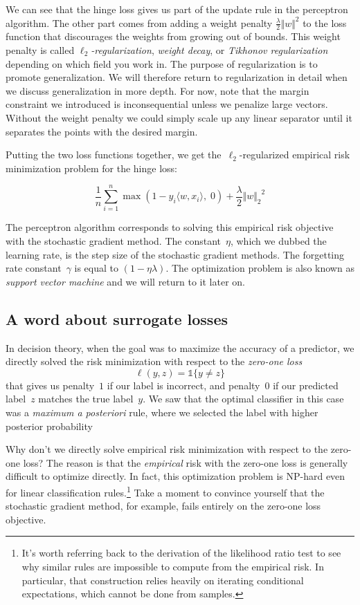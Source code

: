 \documentclass{tufte-book}
\begin{document}
We can see that the hinge loss gives us part of the update rule in the
perceptron algorithm. The other part comes from adding a weight penalty
\(\frac\lambda 2\Vert w\Vert^2\) to the loss function that discourages
the weights from growing out of bounds. This weight penalty is called
\emph{\(\ell_2\)-regularization}, \emph{weight decay}, or \emph{Tikhonov
regularization} depending on which field you work in. The purpose of
regularization is to promote generalization. We will therefore return to
regularization in detail when we discuss generalization in more depth.
For now, note that the margin constraint we introduced is
inconsequential unless we penalize large vectors. Without the weight
penalty we could simply scale up any linear separator until it separates
the points with the desired margin.

Putting the two loss functions together, we get
the~\(\ell_2\)-regularized empirical risk minimization problem for the
hinge loss:

\[
\frac{1}{n}\sum_{i=1}^n \max(1-y_i\langle w, x_i\rangle,\; 0) + \frac\lambda 2 {\Vert w \Vert_2}^2
\]

The perceptron algorithm corresponds to solving this empirical risk
objective with the stochastic gradient method. The constant~\(\eta\),
which we dubbed the learning rate, is the step size of the stochastic
gradient methods. The forgetting rate constant~\(\gamma\) is equal to
\((1-\eta \lambda)\). The optimization problem is also known as
\emph{support vector machine} and we will return to it later on.

\hypertarget{a-word-about-surrogate-losses}{%
\subsection{A word about surrogate
losses}\label{a-word-about-surrogate-losses}}


In decision theory, when the goal was to maximize the accuracy of a
predictor, we directly solved the risk minimization with respect to the
\emph{zero-one loss} \[
\ell(y, z)=\mathbb{1}\{y\ne z\}
\] that gives us penalty~\(1\) if our label is incorrect, and
penalty~\(0\) if our predicted label~\(z\) matches the true label~\(y\).
We saw that the optimal classifier in this case was a \emph{maximum a
posteriori} rule, where we selected the label with higher posterior
probability

Why don't we directly solve empirical risk minimization with respect to
the zero-one loss? The reason is that the \emph{empirical} risk with the
zero-one loss is generally difficult to optimize directly. In fact, this
optimization problem is NP-hard even for linear classification
rules.\footnote{It's worth referring back to the derivation of the
  likelihood ratio test to see why similar rules are impossible to
  compute from the empirical risk. In particular, that construction
  relies heavily on iterating conditional expectations, which cannot be
  done from samples.} Take a moment to convince yourself that the
stochastic gradient method, for example, fails entirely on the zero-one
loss objective.
\end{document}
